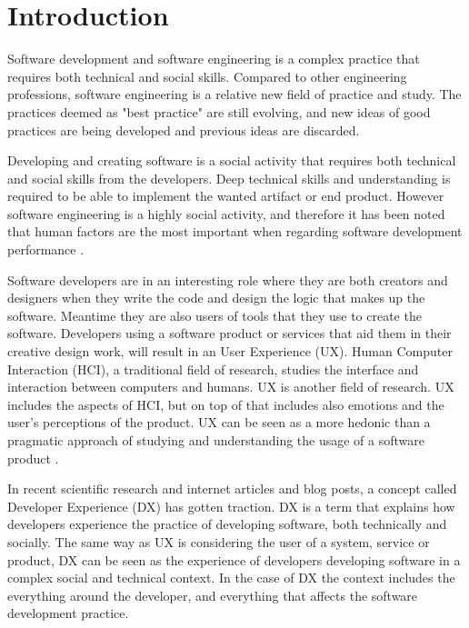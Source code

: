 \documentclass[english, 12pt, a4paper, sci, utf8, a-1b, online]{aaltothesis}
\begin{document}
\cleardoublepage
\section{Introduction} \label{introduction}

Software development and software engineering is a complex practice that requires both technical and social skills. Compared to other engineering professions, software engineering is a relative new field of practice and study. The practices deemed as "best practice" are still evolving, and new ideas of good practices are being developed and previous ideas are discarded.

Developing and creating software is a social activity that requires both technical and social skills from the developers. Deep technical skills and understanding is required to be able to implement the wanted artifact or end product. However software engineering is a highly social activity, and therefore it has been noted that human factors are the most important when regarding software development performance \citep{peopleware}.

Software developers are in an interesting role where they are both creators and designers when they write the code and design the logic that makes up the software. Meantime they are also users of tools that they use to create the software. Developers using a software product or services that aid them in their creative design work, will result in an User Experience (UX). Human Computer Interaction (HCI), a traditional field of research, studies the interface and interaction between computers and humans. UX is another field of research. UX includes the aspects of HCI, but on top of that includes also emotions and the user's perceptions of the product. UX can be seen as a more hedonic than a pragmatic approach of studying and understanding the usage of a software product \citep{the-thing-and-i}.

In recent scientific research and internet articles and blog posts, a concept called Developer Experience (DX) has gotten traction. DX is a term that explains how developers experience the practice of developing software, both technically and socially. The same way as UX is considering the user of a system, service or product, DX can be seen as the experience of developers developing software in a complex social and technical context. In the case of DX the context includes the everything around the developer, and everything that affects the software development practice.
\end{document}
